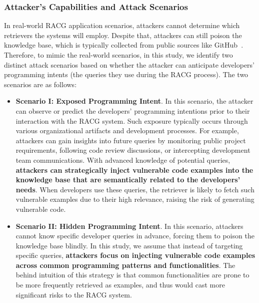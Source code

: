 \subsubsection{Attacker's Capabilities and Attack Scenarios}
\label{subsec:scenarios}
In real-world RACG application scenarios, attackers cannot determine which retrievers the systems will employ.
Despite that, attackers can still poison the knowledge base, which is typically collected from public sources like GitHub~\cite{carlini2024poisoning}.
Therefore, to mimic the real-world scenarios, in this study, we identify two distinct attack scenarios based on whether the attacker can anticipate developers' programming intents (\ie the queries they use during the RACG process). The two scenarios are as follows:
\begin{itemize}[leftmargin=*]
    \item {\bf Scenario I: Exposed Programming Intent}. 
    In this scenario, the attacker can observe or predict the developers' programming intentions prior to their interaction with the RACG system. Such exposure typically occurs through various organizational artifacts and development processes. For example, attackers can gain insights into future queries by monitoring public project requirements, following code review discussions, or intercepting development team communications. With advanced knowledge of potential queries, {\bf attackers can strategically inject vulnerable code examples into the knowledge base that are semantically related to the developers' needs}. 
    When developers use these queries, the retriever is likely to fetch such vulnerable examples due to their high relevance, raising the risk of generating vulnerable code.

    \item {\bf Scenario II: Hidden Programming Intent}.
    In this scenario, attackers cannot know specific developer queries in advance, forcing them to poison the knowledge base blindly. 
    In this study, we assume that instead of targeting specific queries, {\bf attackers focus on injecting vulnerable code examples across common programming patterns and functionalities}. The behind intuition of this strategy is that common functionalities are prone to be more frequently retrieved as examples, and thus would cast more significant risks to the RACG system. 
    \end{itemize}
    

